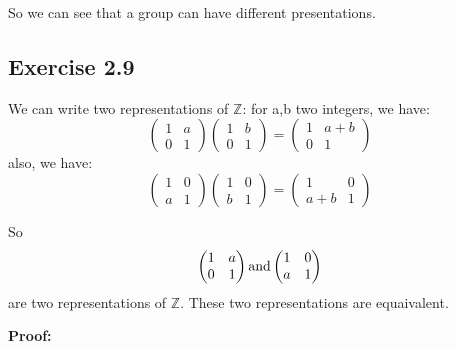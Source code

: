 \documentclass[]{ctexart}
\begin{document}
      So we can see that a group can have different presentations. 
      
      
      
    
    
    \subsection{Exercise 2.9}
    We can write two representations of $\mathbb{Z}$:
    for a,b two integers, we have: 
    \begin{equation*}
      \begin{pmatrix}
      1 & a\\
      0 & 1
      \end{pmatrix}
      \begin{pmatrix}
      1 & b\\
      0 & 1
      \end{pmatrix}
      =
      \begin{pmatrix}
      1 & a+b\\
      0 & 1
      \end{pmatrix}
    \end{equation*}
    also, we have:
    \begin{equation*}
    \begin{pmatrix}
    1 & 0\\
    a & 1
    \end{pmatrix}
    \begin{pmatrix}
    1 & 0\\
    b & 1
    \end{pmatrix}
    =
    \begin{pmatrix}
    1 & 0\\
    a+b & 1
    \end{pmatrix}
    \end{equation*}
    
    So 
    \begin{equation*}
      \begin{pmatrix}
      1 & a\\
      0 & 1
      \end{pmatrix}
      \rm{and}
      \begin{pmatrix}
      1 & 0\\
      a & 1
      \end{pmatrix}
    \end{equation*}
    are two representations of $\mathbb{Z}$. 
    These two representations are equaivalent. 
    
    \textbf{Proof:}
    
\end{document}
